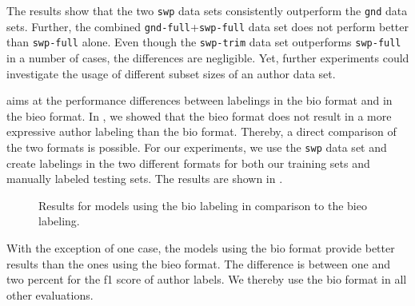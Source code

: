 The results show that the two \texttt{swp} data sets consistently outperform the \texttt{gnd} data sets.
Further, the combined \texttt{gnd-full}+\texttt{swp-full} data set does not perform better than \texttt{swp-full} alone.
Even though the \texttt{swp-trim} data set outperforms \texttt{swp-full} in a number of cases, the differences are negligible.
Yet, further experiments could investigate the usage of different subset sizes of an author data set.

\bigskip

 aims at the performance differences between labelings in the \gls{bio} format and in the \gls{bieo} format.
In , we showed that the \gls{bieo} format does not result in a more expressive author labeling than the \gls{bio} format.
Thereby, a direct comparison of the two formats is possible.
For our experiments, we use the \texttt{swp} data set and create labelings in the two different formats for both our training sets and manually labeled testing sets.
The results are shown in .
\begin{figure}

\caption{Results for models using the \gls{bio} labeling in comparison to the \gls{bieo} labeling.}
\label{fig:eval-end-tags}
\end{figure}
With the exception of one case, the models using the \gls{bio} format provide better results than the ones using the \gls{bieo} format.
The difference is between one and two percent for the \gls{f1 score} of author labels.
We thereby use the \gls{bio} format in all other evaluations.

\bigskip

